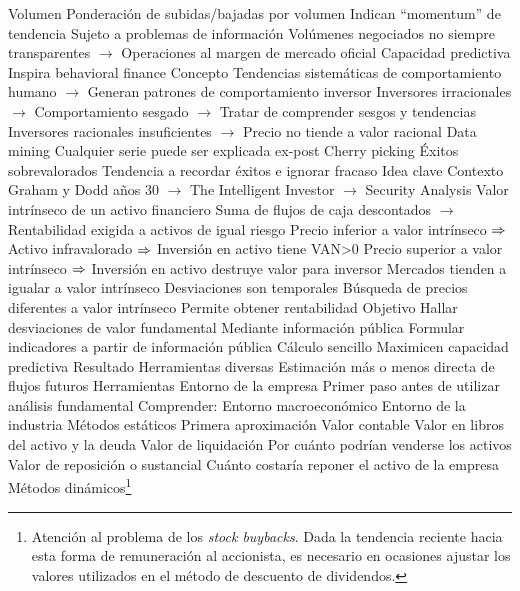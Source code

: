\documentclass{nuevotema}
\begin{document}
\begin{esquemal}
			\3 Volumen
				\4 Ponderación de subidas/bajadas por volumen
				\4[] Indican ``momentum'' de tendencia
				\4 Sujeto a problemas de información
				\4[] Volúmenes negociados no siempre transparentes
				\4[] $\to$ Operaciones al margen de mercado oficial
		\2 Capacidad predictiva
			\3 Inspira behavioral finance
				\4 Concepto
				\4[] Tendencias sistemáticas de comportamiento humano
				\4[] $\to$ Generan patrones de comportamiento inversor
				\4 Inversores irracionales
				\4[] $\to$ Comportamiento sesgado
				\4[] $\to$ Tratar de comprender sesgos y tendencias
				\4 Inversores racionales insuficientes
				\4[] $\to$ Precio no tiende a valor racional
			\3 Data mining
				\4 Cualquier serie puede ser explicada ex-post
			\3 Cherry picking
				\4 Éxitos sobrevalorados
				\4 Tendencia a recordar éxitos e ignorar fracaso
	\1 
		\2 Idea clave
			\3 Contexto
				\4 Graham y Dodd años 30
				\4[] $\to$ The Intelligent Investor
				\4[] $\to$ Security Analysis
				\4 Valor intrínseco de un activo financiero
				\4[] Suma de flujos de caja descontados
				\4[] $\to$ Rentabilidad exigida a activos de igual riesgo
				\4 Precio inferior a valor intrínseco
				\4[] $\Rightarrow$ Activo infravalorado
				\4[] $\Rightarrow$ Inversión en activo tiene VAN>0
				\4 Precio superior a valor intrínseco
				\4[] $\Rightarrow$ Inversión en activo destruye valor para inversor
				\4 Mercados tienden a igualar a valor intrínseco
				\4[] Desviaciones son temporales
				\4 Búsqueda de precios diferentes a valor intrínseco
				\4[] Permite obtener rentabilidad
			\3 Objetivo
				\4 Hallar desviaciones de valor fundamental
				\4[] Mediante información pública
				\4 Formular indicadores a partir de información pública
				\4[] Cálculo sencillo
				\4[] Maximicen capacidad predictiva
			\3 Resultado
				\4 Herramientas diversas
				\4 Estimación más o menos directa de flujos futuros
		\2 Herramientas
			\3 Entorno de la empresa
				\4 Primer paso antes de utilizar análisis fundamental
				\4 Comprender:
				\4[] Entorno macroeconómico
				\4[] Entorno de la industria
			\3 Métodos estáticos
				\4 Primera aproximación
				\4 Valor contable
				\4[] Valor en libros del activo y la deuda
				\4 Valor de liquidación
				\4[] Por cuánto podrían venderse los activos
				\4 Valor de reposición o sustancial
				\4[] Cuánto costaría reponer el activo de la empresa
			\3 Métodos dinámicos\footnote{Atención al problema de los \textit{stock buybacks}. Dada la tendencia reciente hacia esta forma de remuneración al accionista, es necesario en ocasiones ajustar los valores utilizados en el método de descuento de dividendos.}

\end{esquemal}
\end{document}
